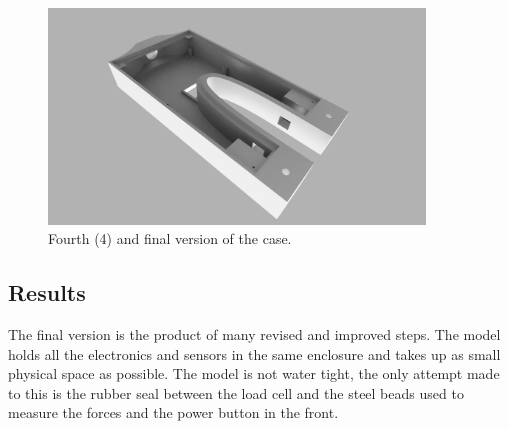 \begin{figure}[H]
\begin{center}
	\includegraphics[width = 10cm]{Figures/Case_rev_4.png}
	\caption{Fourth (4) and final version of the case.}
	\label{Case_rev_4}
\end{center}
\end{figure}

\subsection{Results}
The final version is the product of many revised and improved steps. The model holds all the electronics and sensors in the same enclosure and takes up as small physical space as possible. The model is not water tight, the only attempt made to this is the rubber seal between the load cell and the steel beads used to measure the forces and the power button in the front.

